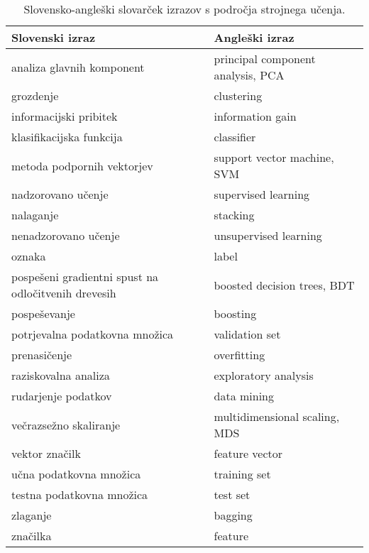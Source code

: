 \begin{table}[ht]
	\centering
	\begin{tabular}{ll}
		\hline
		\textbf{Slovenski izraz} & \textbf{Angleški izraz} \\
		\hline
		analiza glavnih komponent & principal component analysis, PCA \\
		grozdenje & clustering \\
		informacijski pribitek & information gain \\
		klasifikacijska funkcija & classifier \\
		metoda podpornih vektorjev & support vector machine, SVM \\
		nadzorovano učenje & supervised learning \\
		nalaganje & stacking \\
		nenadzorovano učenje & unsupervised learning \\
		oznaka & label \\
		pospešeni gradientni spust na odločitvenih drevesih & boosted decision trees, BDT \\
		pospeševanje & boosting \\
		potrjevalna podatkovna množica & validation set \\
		prenasičenje & overfitting \\
		raziskovalna analiza & exploratory analysis \\
		rudarjenje podatkov & data mining \\
		večrazsežno skaliranje & multidimensional scaling, MDS \\
		vektor značilk & feature vector \\
		učna podatkovna množica & training set \\	
		testna podatkovna množica & test set \\
		zlaganje & bagging \\	
		značilka & feature \\
	\end{tabular}
	\caption{Slovensko-angleški slovarček izrazov s področja strojnega učenja.}
	\label{slovar}
\end{table}
